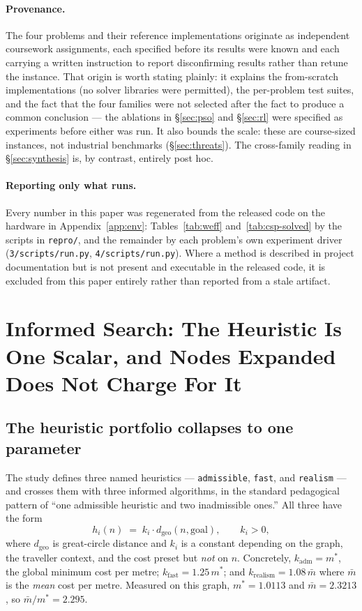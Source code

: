 \documentclass[11pt]{article}
\newcommand{\dgeo}{d_{\mathrm{geo}}}
\begin{document}
\paragraph{Provenance.} The four problems and their reference implementations originate as
independent coursework assignments, each specified before its results were known and each carrying
a written instruction to report disconfirming results rather than retune the instance. That origin
is worth stating plainly: it explains the from-scratch implementations (no solver libraries were
permitted), the per-problem test suites, and the fact that the four families were not selected
after the fact to produce a common conclusion --- the ablations in \S\ref{sec:pso} and
\S\ref{sec:rl} were specified as experiments before either was run. It also bounds the scale:
these are course-sized instances, not industrial benchmarks (\S\ref{sec:threats}). The
cross-family reading in \S\ref{sec:synthesis} is, by contrast, entirely post hoc.

\paragraph{Reporting only what runs.} Every number in this paper was regenerated from the released
code on the hardware in Appendix~\ref{app:env}: Tables~\ref{tab:weff} and~\ref{tab:csp-solved} by
the scripts in \texttt{repro/}, and the remainder by each problem's own experiment driver
(\texttt{3/scripts/run.py}, \texttt{4/scripts/run.py}). Where a method
is described in project documentation but is not present and executable in the released code, it
is excluded from this paper entirely rather than reported from a stale artifact.

\section{Informed Search: The Heuristic Is One Scalar, and Nodes Expanded Does Not Charge For It}
\label{sec:search}

\subsection{The heuristic portfolio collapses to one parameter}

The study defines three named heuristics --- \texttt{admissible}, \texttt{fast}, and
\texttt{realism} --- and crosses them with three informed algorithms, in the standard pedagogical
pattern of ``one admissible heuristic and two inadmissible ones.'' All three have the form
\begin{equation}
h_i(n) \;=\; k_i \cdot \dgeo(n, \text{goal}), \qquad k_i > 0,
\label{eq:hform}
\end{equation}
where $\dgeo$ is great-circle distance and $k_i$ is a constant depending on the graph, the
traveller context, and the cost preset but \emph{not} on $n$. Concretely,
$k_{\text{adm}} = m^{*}$, the global minimum cost per metre;
$k_{\text{fast}} = 1.25\, m^{*}$; and $k_{\text{realism}} = 1.08\,\bar{m}$ where $\bar{m}$ is the
\emph{mean} cost per metre. Measured on this graph, $m^{*} = 1.0113$ and $\bar{m} = 2.3213$, so
$\bar{m}/m^{*} = 2.295$.
\end{document}
